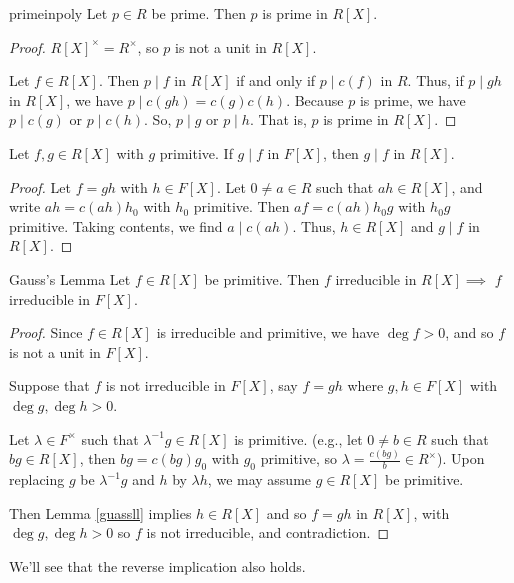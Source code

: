 \begin{corollary}{}{primeinpoly}
    Let \(p \in R\) be prime. Then \(p\) is prime in \(R[X]\).
\end{corollary}
\begin{proof}
    \(R[X]^\times = R^\times\), so \(p\) is not a unit in \(R[X]\).

    Let \(f \in R[X]\). Then \(p \mid f\) in \(R[X]\) if and only if \(p \mid c(f)\) in \(R\). Thus, if \(p \mid gh\) in \(R[X]\), we have \(p \mid c(gh) = c(g)c(h)\). Because \(p\) is prime, we have \(p \mid c(g)\) or \(p \mid c(h)\). So, \(p \mid g\) or \(p \mid h\). That is, \(p\) is prime in \(R[X]\).
\end{proof}
\begin{lemma}{}{}
    \label{guassll}
    Let \(f, g \in R[X]\) with \(g\) primitive. If \(g \mid f\) in \(F[X]\), then \(g\mid f\) in \(R[X]\).
\end{lemma}
\begin{proof}
    Let \(f = gh\) with \(h \in F[X]\). Let \(0 \neq a \in R\) such that \(ah \in R[X]\), and write \(ah = c(ah)h_0\) with \(h_0\) primitive. Then \(af = c(ah)h_0 g\) with \(h_0 g\) primitive. Taking contents, we find \(a \mid c(ah)\). Thus, \(h \in R[X]\) and \(g \mid f\) in \(R[X]\).
\end{proof}
\begin{lemma}{Gauss's Lemma}{}
    \label{Guassle}
    Let \(f \in R[X]\) be primitive. Then \(f\) irreducible in \(R[X]\implies\) \(f\) irreducible in \(F[X]\).
\end{lemma}
\begin{proof}
    Since \(f \in R[X]\) is irreducible and primitive, we have \(\deg f > 0\), and so \(f\) is not a unit in \(F[X]\).

    Suppose that \(f\) is not irreducible in \(F[X]\), say \(f = gh\) where \(g, h \in F[X]\) with \(\deg g, \deg h > 0\).

    Let \(\lambda \in F^\times \) such that \(\lambda^{-1}g \in R[X]\) is primitive. (e.g., let \(0 \neq b \in R\) such that \(bg \in R[X]\), then \(bg = c(bg)g_0\) with \(g_0\) primitive, so \(\lambda=\frac{c(bg)}{b}\in R^\times \)). Upon replacing \(g\) be \(\lambda^{-1}g\) and \(h\) by \(\lambda h\), we may assume \(g \in R[X]\) be primitive.

    Then Lemma \eqref{guassll} implies \(h \in R[X]\) and so \(f = gh\) in \(R[X]\), with \(\deg g, \deg h > 0\) so \(f\) is not irreducible, and contradiction.
\end{proof}
\begin{remark}
    We'll see that the reverse implication also holds.
\end{remark}
